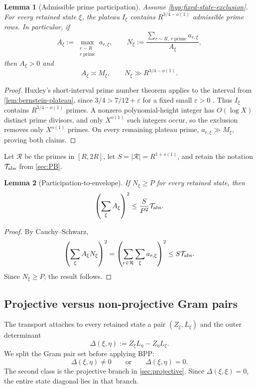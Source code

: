 \documentclass[11pt]{article}
\newtheorem{lemma}[lemma]{Lemma}
\theoremstyle{definition}
\newcommand{\1}{\mathbf 1}
\begin{document}
\begin{lemma}[Admissible prime participation]
\label{lem:prime-participation}
Assume \cref{hyp:fixed-state-exclusion}.  For every retained state $\xi$, the
plateau $I_{\xi}$ contains $R^{3/4-o(1)}$ admissible prime rows.  In particular,
if
\[
 A_{\xi}:=\max_{\substack{r\sim R\\r\ \mathrm{prime}}}a_{r,\xi},
 \qquad
 N_{\xi}:=\frac{\sum_{r\sim R,\ r\ \mathrm{prime}}a_{r,\xi}}{A_{\xi}},
\]
then $A_{\xi}>0$ and
\begin{equation}
   A_{\xi}\asymp M_{\xi},\qquad N_{\xi}\gg R^{3/4-o(1)}.
   \label{eq:participation}
\end{equation}
\end{lemma}
\begin{proof}
Huxley's short-interval prime number theorem applies to the interval from
\cref{lem:bernstein-plateau}, since $3/4>7/12+\varepsilon$ for a fixed small
$\varepsilon>0$ \cite{Huxley1972}.  Thus $I_{\xi}$ contains
$R^{3/4-o(1)}$ primes.  A nonzero polynomial-height integer has $O(\log X)$
distinct prime divisors, and only $X^{o(1)}$ such integers occur, so the
exclusion removes only $X^{o(1)}$ primes.  On every remaining plateau prime,
$a_{r,\xi}\gg M_{\xi}$, proving both claims.
\end{proof}

Let $\mathcal R$ be the primes in $[R,2R]$, let
$S=|\mathcal R|=R^{1+o(1)}$, and retain the notation $\mathcal T_{\rm abs}$
from \cref{sec:PB}.

\begin{lemma}[Participation-to-envelope]
\label{lem:participation-envelope}
If $N_{\xi}\ge P$ for every retained state, then
\[
   \left(\sum_{\xi}A_{\xi}\right)^2
   \le \frac{S}{P^2}\mathcal T_{\rm abs}.
\]
\end{lemma}
\begin{proof}
By Cauchy--Schwarz,
\[
 \left(\sum_{\xi}A_{\xi}N_{\xi}\right)^2
 =\left(\sum_{r\in\mathcal R}\sum_{\xi}a_{r,\xi}\right)^2
 \le S\mathcal T_{\rm abs}.
\]
Since $N_{\xi}\ge P$, the result follows.
\end{proof}

\subsection{Projective versus non-projective Gram pairs}
The transport attaches to every retained state a pair $(Z_{\xi},L_{\xi})$ and the
outer determinant
\begin{equation}
   \Delta(\xi,\eta):=Z_{\xi} L_{\eta}-Z_{\eta} L_{\xi}.
   \label{eq:outer-delta}
\end{equation}
We split the Gram pair set before applying BPP:
\[
   \Delta(\xi,\eta)\ne0\qquad\text{or}\qquad\Delta(\xi,\eta)=0.
\]
The second class is the projective branch in \cref{sec:projective}.  Since
$\Delta(\xi,\xi)=0$, the entire state diagonal lies in that branch.
\end{document}
